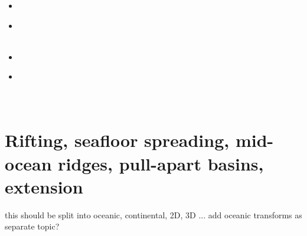 \begin{scriptsize}
\begin{itemize}
\textcite{lepo13} \\ 
\textcite{miam13} \\ 
\textcite{mont13} \\
\item[\twothousandfourteen] 
\textcite{codb14} \\
\item[\twothousandfifteen] 
\textcite{chpe15} \\ 
\textcite{ohkh15} \\
\item[\twothousandseventeen] 
\textcite{bocc17} \\
\item[\twothousandnineteen] 
\textcite{rejv19} \\ 
\textcite{hakt19} \\
\textcite{gocg19} \\
\end{itemize}
\end{scriptsize}

\section{Rifting, seafloor spreading, mid-ocean ridges, pull-apart basins, extension}

{\color{red} this should be split into oceanic, continental, 2D, 3D ...}
add oceanic transforms as separate topic?

